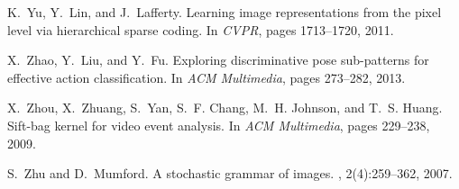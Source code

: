 \documentclass{sig-alternate}
\begin{document}
\begin{thebibliography}{40}
K.~Yu, Y.~Lin, and J.~Lafferty.
\newblock Learning image representations from the pixel level via hierarchical
  sparse coding.
\newblock In {\em CVPR}, pages 1713--1720, 2011.

X.~Zhao, Y.~Liu, and Y.~Fu.
\newblock Exploring discriminative pose sub-patterns for effective action
  classification.
\newblock In {\em ACM Multimedia}, pages 273--282, 2013.

X.~Zhou, X.~Zhuang, S.~Yan, S.~F. Chang, M.~H. Johnson, and T.~S. Huang.
\newblock Sift-bag kernel for video event analysis.
\newblock In {\em ACM Multimedia}, pages 229--238, 2009.

S.~Zhu and D.~Mumford.
\newblock A stochastic grammar of images.
,
  2(4):259--362, 2007.

\end{thebibliography}
\end{document}
